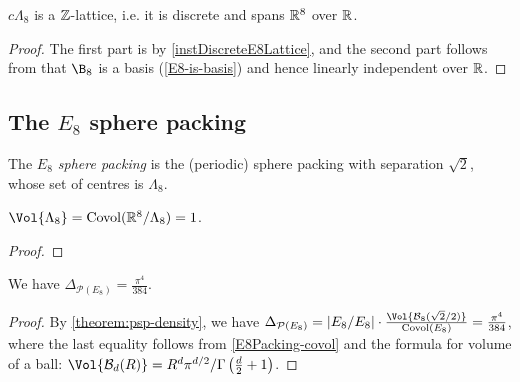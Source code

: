 \begin{lemma}\label{instLatticeE8}\leanok
  $c\Lambda_8$ is a $\mathbb{Z}$-lattice, i.e. it is discrete and spans $\mathbb{R}^8$ over $\mathbb{R}$.
\end{lemma}
\begin{proof}\leanok
  The first part is by \cref{instDiscreteE8Lattice}, and the second part follows from that $\B_8$ is a basis (\cref{E8-is-basis}) and hence linearly independent over $\mathbb{R}$.
\end{proof}


\subsection{The $E_8$ sphere packing}

\begin{definition}\label{E8Packing}\leanok
  The \emph{$E_8$ sphere packing} is the (periodic) sphere packing with separation $\sqrt{2}$, whose set of centres is $\Lambda_8$.
\end{definition}

\begin{lemma}\label{E8Packing-covol}\leanok
  $\Vol{\Lambda_8} = \mathrm{Covol}(\R^8 / \Lambda_8) = 1$.
\end{lemma}
\begin{proof}\leanok
\end{proof}

\begin{theorem}\label{E8Packing-density}\leanok
  We have $\Delta_{\mathcal{P}(E_8)} = \frac{\pi^4}{384}$.
\end{theorem}
\begin{proof}\leanok
  By \cref{theorem:psp-density}, we have $\Delta_{\mathcal{P}(E_8)} = |E_8 / E_8| \cdot \frac{\Vol{\mathcal{B}_8(\sqrt{2} / 2)}}{\mathrm{Covol}(E_8)} = \frac{\pi^4}{384}$, where the last equality follows from \cref{E8Packing-covol} and the formula for volume of a ball: $\Vol{\mathcal{B}_d(R)} = R^d \pi^{d / 2} / \Gamma\left(\frac{d}{2} + 1\right)$.
\end{proof}


